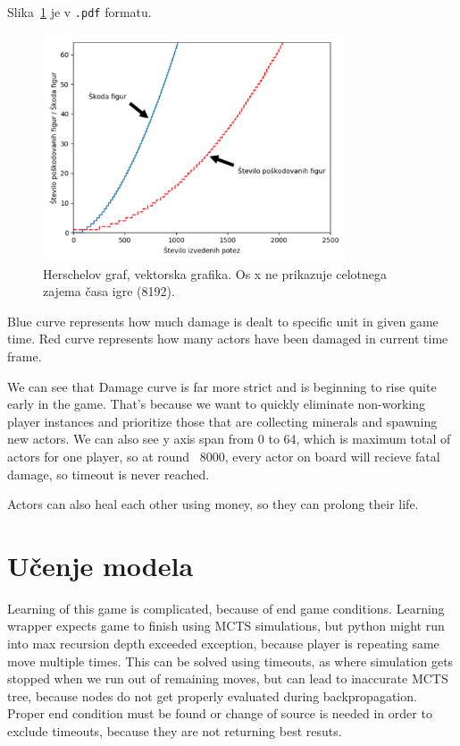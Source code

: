 \documentclass[a4paper, 12pt]{book}
\begin{document}
Slika~\ref{destroy_formula_2018_10_20} je v {\tt .pdf} formatu.
\begin{figure}[h]
	\begin{center}
		\includegraphics[width=0.8\textwidth]{destroy_formula_2018_10_20.pdf}
	\end{center}
	\caption{Herschelov graf, vektorska grafika. Os x ne prikazuje celotnega zajema časa igre (8192).}
	\label{destroy_formula_2018_10_20}
\end{figure}
Blue curve represents how much damage is dealt to specific unit in given game time. Red curve represents how many actors have been damaged in current time frame.

We can see that Damage curve is far more strict and is beginning to rise quite early in the game. That's because we want to quickly eliminate non-working player instances and prioritize those that are collecting minerals and spawning new actors. We can also see y axis span from 0 to 64, which is maximum total of actors for one player, so at round ~8000, every actor on board will recieve fatal damage, so timeout is never reached.

Actors can also heal each other using money, so they can prolong their life.


\chapter{Učenje modela}
\label{chucenjemodela}
Learning of this game is complicated, because of end game conditions. Learning wrapper expects game to finish using MCTS simulations, but python might run into max recursion depth exceeded exception, because player is repeating same move multiple times.
This can be solved using timeouts, as where simulation gets stopped when we run out of remaining moves, but can lead to inaccurate MCTS tree, because nodes do not get properly evaluated during backpropagation.
Proper end condition must be found or change of source is needed in order to exclude timeouts, because they are not returning best resuts.
\end{document}
